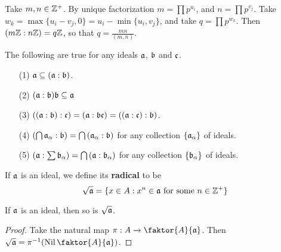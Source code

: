 \begin{example}\label{example_1.25}
  Take $m,n \in \Z^+$. By unique factorization $m=\prod{p^{u_i}}$, and
  $n=\prod{p^{v_j}}$. Take $w_k=\max{\{u_i-v_j,0\}}=u_i-\min{\{u_i,v_j\}}$, and
  take $q=\prod{p^{w_k}}$. Then $(m\Z:n\Z)=q\Z$, so that $q=\frac{mn}{(m,n)}$.
\end{example}

\begin{lemma}\label{lemma_1.10.9}
  The following are true for any ideals $\af$,  $\bf$ and  $\cf$.
  \begin{enumerate}
    \item[(1)] $\af \subseteq (\af:\bf)$.

    \item[(2)] $(\af:\bf)\bf \subseteq \af$

    \item[(3)] $((\af:\bf):\cf)=(\af:\bf\cf)=((\af:\cf):\bf)$.

    \item[(4)] $(\bigcap{\af_\a}:\bf)=\bigcap{(\af_\a:\bf)}$ for any collection
      $\{\af_\a\}$ of ideals.

    \item[(5)] $(\af:\sum{\bf_\a})=\bigcap{(\af:\bf_\a)}$ for any collection
      $\{\bf_\a\}$ of ideals.
  \end{enumerate}
\end{lemma}

\begin{definition}
  If $\af$ is an ideal, we define its \textbf{radical} to be
  \begin{equation*}
    \sqrt{\af}=\{x \in A : x^n \in \af \text{ for some } n \in \Z^+\}
  \end{equation*}
\end{definition}

\begin{lemma}\label{lemma_1.10.10}
  If $\af$ is an ideal, then so is $\sqrt{\af}$.
\end{lemma}
\begin{proof}
  Take the natural map $\pi:A \xrightarrow{} \faktor{A}{\af}$. Then
  $\sqrt{\af}=\inv{\pi}(\Nil{\faktor{A}{\af}})$.
\end{proof}

